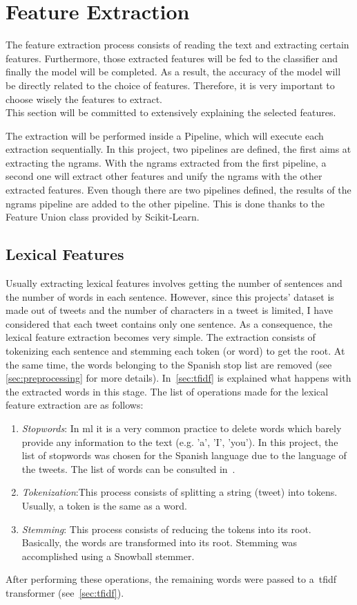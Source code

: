 \section{Feature Extraction}
\label{sec:feature}
The feature extraction process consists of reading the text and extracting certain features. Furthermore, those extracted features will be fed to the classifier and finally the model will be completed. As a result, the accuracy of the model will be directly related to the choice of features. Therefore, it is very important to choose wisely the features to extract.\\
This section will be committed to extensively explaining the selected features.
\par
The extraction will be performed inside a Pipeline, which will execute each extraction sequentially. In this project, two pipelines are defined, the first aims at extracting the ngrams. With the ngrams extracted from the first pipeline, a second one will extract other features and unify the ngrams with the other extracted features. Even though there are two pipelines defined, the results of the ngrams pipeline are added to the other pipeline. This is done thanks to the Feature Union class provided by Scikit-Learn.
\subsection{Lexical Features}
Usually extracting lexical features involves getting the number of sentences and the number of words in each sentence. However, since this projects' dataset is made out of tweets and the number of characters in a tweet is limited, I have considered that each tweet contains only one sentence. As a consequence, the lexical feature extraction becomes very simple. The extraction consists of tokenizing each sentence and stemming each token (or word) to get the root. At the same time, the words belonging to the Spanish stop list are removed (see \cref{sec:preprocessing} for more details). In~\cref{sec:tfidf} is explained what happens with the extracted words in this stage. The list of operations made for the lexical feature extraction are as follows:
\begin{enumerate}
	\item \textit{Stopwords}:  In \ac{ml} it is a very common practice to delete words which barely provide any information to the text (e.g. 'a', 'I', 'you'). In this project, the list of stopwords was chosen for the Spanish language due to the language of the tweets. The list of words can be consulted in~\cite{stopwords}.
	\item \textit{Tokenization}:This process consists of splitting a string (tweet) into tokens. Usually, a token is the same as a word.
	\item 
	\textit{Stemming}: This process consists of reducing the tokens into its root. Basically, the words are transformed into its root. Stemming was accomplished using a Snowball stemmer. 
\end{enumerate}
After performing these operations, the remaining words were passed to a~\acl{tfidf} transformer (see~\cref{sec:tfidf}).
